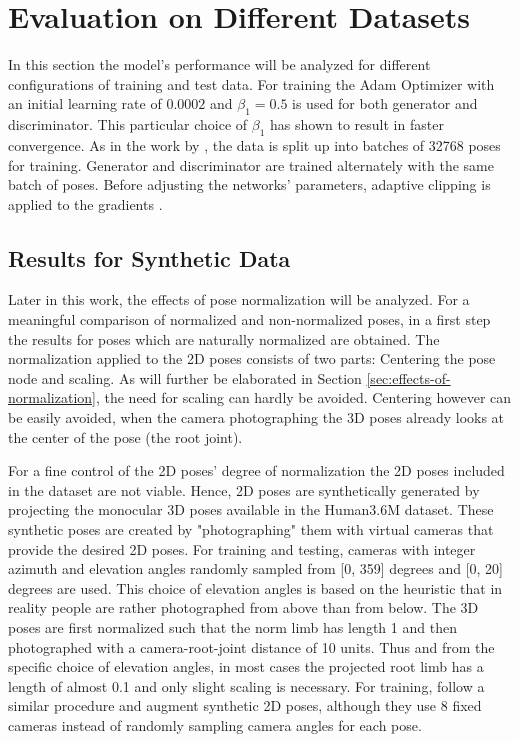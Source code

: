 \section{Evaluation on Different Datasets}
\label{sec:evaluation}

In this section the model's performance will be analyzed for different configurations of training and test data.
For training the Adam Optimizer \cite{kingma17} with an initial learning rate of $0.0002$ and $\beta_1 = 0.5$ is used for both generator and discriminator.
This particular choice of $\beta_1$ has shown to result in faster convergence.
As in the work by \citet{drover18}, the data is split up into batches of 32768 poses for training.
Generator and discriminator are trained alternately with the same batch of poses.
Before adjusting the networks' parameters, adaptive clipping is applied to the gradients \cite[Section~3.2.1]{chorowski14}.


\subsection{Results for Synthetic Data}

Later in this work, the effects of pose normalization will be analyzed.
For a meaningful comparison of normalized and non-normalized poses, in a first step the results for poses which are naturally normalized are obtained.
The normalization applied to the 2D poses consists of two parts: Centering the pose node and scaling.
As will further be elaborated in Section \ref{sec:effects-of-normalization}, the need for scaling can hardly be avoided.
Centering however can be easily avoided, when the camera photographing the 3D poses already looks at the center of the pose (the root joint).

For a fine control of the 2D poses' degree of normalization the 2D poses included in the dataset are not viable.
Hence, 2D poses are synthetically generated by projecting the monocular 3D poses available in the Human3.6M dataset.
These synthetic poses are created by "photographing" them with virtual cameras that provide the desired 2D poses.
For training and testing, cameras with integer azimuth and elevation angles randomly sampled from [0, 359] degrees and [0, 20] degrees are used.
This choice of elevation angles is based on the heuristic that in reality people are rather photographed from above than from below.
The 3D poses are first normalized such that the norm limb has length 1 and then photographed with a camera-root-joint distance of 10 units.
Thus and from the specific choice of elevation angles, in most cases the projected root limb has a length of almost 0.1 and only slight scaling is necessary.
For training, \citet{drover18} follow a similar procedure and augment synthetic 2D poses, although they use 8 fixed cameras instead of randomly sampling camera angles for each pose.

